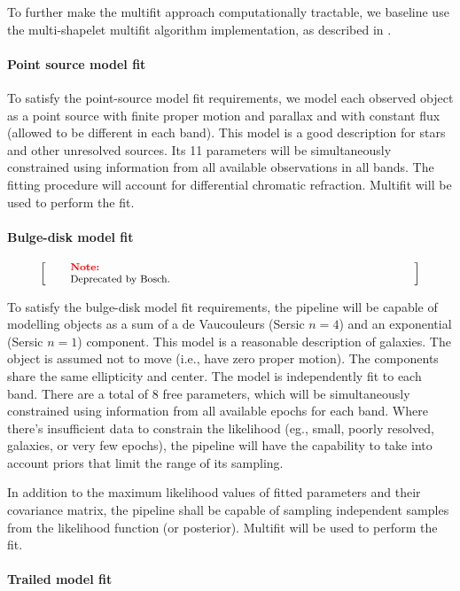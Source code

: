 \documentclass[12pt]{article}
\newenvironment{note}[1][Note]
{
  \begin{displaymath}
    \left[ \qquad
    \begin{minipage}[h]{.75\linewidth}
      \color{red} \footnotesize
      \textbf{#1:} \newline
      \color{black}
}
{
    \end{minipage}
    \normalsize
    \qquad \right]
  \end{displaymath}
}
\begin{document}
To further make the multifit approach computationally tractable, we baseline use the multi-shapelet multifit algorithm implementation, as described in \cite{Bosch13}.

\paragraph{Point source model fit} To satisfy the point-source model fit requirements, we model each observed object as a point source with finite proper motion and parallax and with constant flux (allowed to be different in each band). This model is a good description for stars and other unresolved sources. Its 11 parameters will be simultaneously constrained using information from all available observations in all bands. The fitting procedure will account for differential chromatic refraction. Multifit will be used to perform the fit.

\paragraph{Bulge-disk model fit}

\begin{note}
Deprecated by Bosch.
\end{note}

To satisfy the bulge-disk model fit requirements, the pipeline will be capable of modelling objects as a sum of a de Vaucouleurs (Sersic $n=4$) and an exponential (Sersic $n=1$) component. This model is a reasonable description of galaxies. The object is assumed not to move (i.e., have zero proper motion). The components share the same ellipticity and center. The model is independently fit to each band. There are a total of 8 free parameters, which will be simultaneously constrained using information from all available epochs for each band. Where there's insufficient data to constrain the likelihood (eg., small, poorly resolved, galaxies, or very few epochs), the pipeline will have the capability to take into account priors that limit the range of its sampling.

In addition to the maximum likelihood values of fitted parameters and their covariance matrix, the pipeline shall be capable of sampling independent samples from the likelihood function (or posterior). Multifit will be used to perform the fit.

\paragraph{Trailed model fit}
\end{document}
